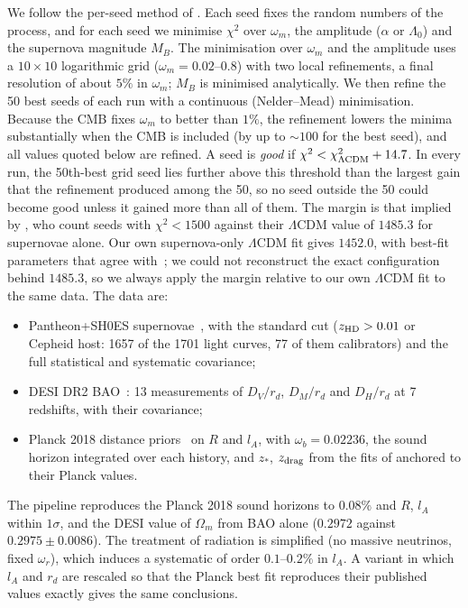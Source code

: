 \documentclass{iopjournal}
\begin{document}
We follow the per-seed method of \cite{Das2024}. Each seed fixes the random
numbers of the process, and for each seed we minimise $\chi^2$ over
$\omega_m$, the amplitude ($\alpha$ or $\Lambda_0$) and the supernova magnitude
$M_B$. The minimisation over $\omega_m$ and the amplitude uses a $10\times10$
logarithmic grid ($\omega_m=0.02$--$0.8$) with two local refinements, a final
resolution of about $5\%$ in $\omega_m$; $M_B$ is minimised analytically. We
then refine the 50 best seeds of each run with a continuous (Nelder--Mead)
minimisation. Because the CMB fixes $\omega_m$ to better than $1\%$, the
refinement lowers the minima substantially when the CMB is included (by up to
$\sim100$ for the best seed), and all values quoted below are refined. A
seed is \emph{good} if $\chi^2<\chi^2_{\Lambda{\rm CDM}}+14.7$. In every run,
the 50th-best grid seed lies further above this threshold than the largest
gain that the refinement produced among the 50, so no seed outside the 50
could become good unless it gained more than all of them.
The margin is that implied by \cite{Das2024}, who count seeds with
$\chi^2<1500$ against their $\Lambda$CDM value of $1485.3$ for supernovae
alone. Our own supernova-only $\Lambda$CDM fit gives $1452.0$, with best-fit
parameters that agree with~\cite{Brout2022}; we could not reconstruct the
exact configuration behind $1485.3$, so we always apply the margin relative
to our own $\Lambda$CDM fit to the same data. The data are:
\begin{itemize}
\item Pantheon+SH0ES supernovae~\cite{Scolnic2022,Brout2022,Riess2022}, with
the standard cut ($z_{\rm HD}>0.01$ or Cepheid host: 1657 of the 1701 light
curves, 77 of them calibrators) and the full statistical and systematic
covariance;
\item DESI DR2 BAO~\cite{DESI2025}: 13 measurements of $D_V/r_d$, $D_M/r_d$
and $D_H/r_d$ at 7 redshifts, with their covariance;
\item Planck 2018 distance priors~\cite{Chen2019} on $R$ and $l_A$, with
$\omega_b=0.02236$, the sound horizon integrated over each history, and
$z_*$, $z_{\rm drag}$ from the fits of \cite{HuSugiyama1996,EisensteinHu1998}
anchored to their Planck values.
\end{itemize}
The pipeline reproduces the Planck 2018 sound horizons to $0.08\%$ and $R$,
$l_A$ within $1\sigma$, and the DESI value of $\Omega_m$ from BAO alone
($0.2972$ against $0.2975\pm0.0086$). The treatment of radiation is
simplified (no massive neutrinos, fixed $\omega_r$), which induces a
systematic of order $0.1$--$0.2\%$ in $l_A$. A variant in which $l_A$ and
$r_d$ are rescaled so that the Planck best fit reproduces their published
values exactly gives the same conclusions.
\end{document}
